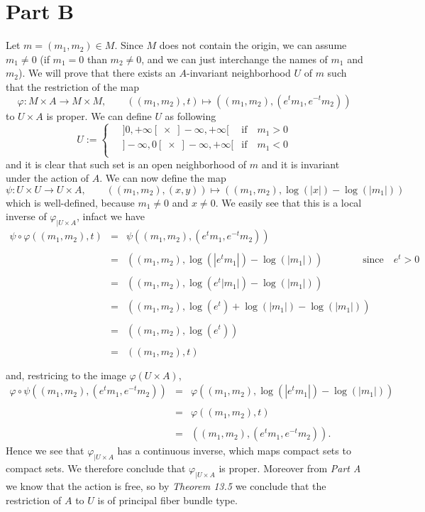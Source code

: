 \documentclass[]{article}
\begin{document}
\section{Part B}
Let $m=(m_1,m_2) \in M$. Since $M$ does not contain the origin, we can assume $m_1 \neq 0$ (if $m_1=0$ than $m_2 \neq 0$, and we can just interchange the names of $m_1$ and $m_2$). We will prove that there exists an $A$-invariant neighborhood $U$ of $m$ such that the restriction of the map $$ \varphi:M\times A \to M\times M, \qquad ((m_1,m_2),t) \mapsto ((m_1,m_2),(e^tm_1,e^{-t}m_2)) $$ to $U\times A$ is proper. We can define $U$ as following
$$ U:= \begin{cases}
	\quad ]0,+\infty[\;\times\;]-\infty,+\infty[ &\text{if} \quad m_1 > 0 \\
	\quad ]-\infty,0[\;\times\;]-\infty,+\infty[ &\text{if} \quad m_1 < 0 \\	
\end{cases} $$
and it is clear that such set is an open neighborhood of $m$ and it is invariant under the action of $A$. We can now define the map $$\psi:U\times U \to U\times A, \qquad ((m_1,m_2), (x,y)) \mapsto ((m_1,m_2), \log(|x|)-\log(|m_1|)) $$ which is well-defined, because $m_1 \neq 0$ and $x \neq 0$. We easily see that this is a local inverse of $\varphi_{| U\times A}$, infact we have 
\begin{eqnarray*}
	\psi\circ\varphi((m_1,m_2),t) &=& \psi((m_1,m_2),(e^tm_1,e^{-t}m_2)) \\\\ 
	&=& ((m_1,m_2),\log(|e^tm_1|)-\log(|m_1|)) \qquad\qquad \text{since}\quad e^t>0 \\\\
	&=& ((m_1,m_2),\log(e^t|m_1|)-\log(|m_1|)) \\\\
	&=& ((m_1,m_2),\log(e^t)+\log(|m_1|)-\log(|m_1|)) \\\\
	&=& ((m_1,m_2),\log(e^t)) \\\\
	&=& ((m_1,m_2),t) \\\\
\end{eqnarray*}
and, restricing to the image $\varphi(U\times A)$,
\begin{eqnarray*}
	\varphi\circ\psi((m_1,m_2),(e^tm_1,e^{-t}m_2)) &=& \varphi((m_1,m_2),\log(|e^tm_1|)-\log(|m_1|)) \\\\ 
	&=& \varphi((m_1,m_2),t) \\\\
	&=& ((m_1,m_2),(e^tm_1,e^{-t}m_2)).
\end{eqnarray*}
Hence we see that $\varphi_{| U\times A}$ has a continuous inverse, which maps compact sets to compact sets. We therefore conclude that $\varphi_{| U\times A}$ is proper. Moreover from \emph{Part A} we know that the action is free, so by \emph{Theorem 13.5} we conclude that the restriction of $A$ to $U$ is of principal fiber bundle type.
\end{document}
